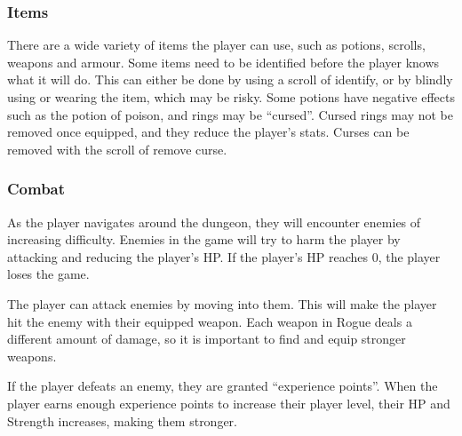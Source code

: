\documentclass[11pt,a4paper]{article}
\begin{document}
\subsubsection{Items}
There are a wide variety of items the player can use, such as potions, scrolls, weapons and armour. Some items need to be identified before the player knows what it will do. This can either be done by using a scroll of identify, or by blindly using or wearing the item, which may be risky. Some potions have negative effects such as the potion of poison, and rings may be ``cursed''. Cursed rings may not be removed once equipped, and they reduce the player's stats. Curses can be removed with the scroll of remove curse.

\subsubsection{Combat}
As the player navigates around the dungeon, they will encounter enemies of increasing difficulty. Enemies in the game will try to harm the player by attacking and reducing the player's HP. If the player's HP reaches 0, the player loses the game.

The player can attack enemies by moving into them. This will make the player hit the enemy with their equipped weapon. Each weapon in Rogue deals a different amount of damage, so it is important to find and equip stronger weapons.

If the player defeats an enemy, they are granted ``experience points''. When the player earns enough experience points to increase their player level, their HP and Strength increases, making them stronger.





\end{document}
